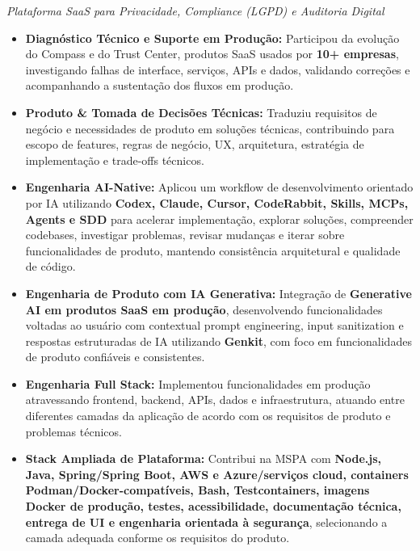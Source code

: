 \documentclass[10pt,a4paper]{article}
\begin{document}
\textit{Plataforma SaaS para Privacidade, Compliance (LGPD) e Auditoria Digital}

\begin{itemize}

    \item
    \textbf{Diagnóstico Técnico e Suporte em Produção:}
    Participou da evolução do Compass e do Trust Center, produtos
    SaaS usados por \textbf{10+ empresas}, investigando falhas de
    interface, serviços, APIs e dados, validando correções e
    acompanhando a sustentação dos fluxos em produção.

    \item
    \textbf{Produto \& Tomada de Decisões Técnicas:}
    Traduziu requisitos de negócio e necessidades de produto em
    soluções técnicas, contribuindo para escopo de features,
    regras de negócio, UX, arquitetura, estratégia de
    implementação e trade-offs técnicos.

    \item
    \textbf{Engenharia AI-Native:}
    Aplicou um workflow de desenvolvimento orientado por IA
    utilizando \textbf{Codex, Claude, Cursor, CodeRabbit, Skills,
    MCPs, Agents e SDD} para acelerar implementação, explorar
    soluções, compreender codebases, investigar problemas,
    revisar mudanças e iterar sobre funcionalidades de produto,
    mantendo consistência arquitetural e qualidade de código.

    \item
    \textbf{Engenharia de Produto com IA Generativa:}
    Integração de \textbf{Generative AI em produtos SaaS em
    produção}, desenvolvendo funcionalidades voltadas ao usuário
    com contextual prompt engineering, input sanitization e
    respostas estruturadas de IA utilizando \textbf{Genkit},
    com foco em funcionalidades de produto confiáveis e
    consistentes.

    \item
    \textbf{Engenharia Full Stack:}
    Implementou funcionalidades em produção atravessando
    frontend, backend, APIs, dados e infraestrutura, atuando
    entre diferentes camadas da aplicação de acordo com os
    requisitos de produto e problemas técnicos.

    \item
    \textbf{Stack Ampliada de Plataforma:}
    Contribui na MSPA com \textbf{Node.js, Java, Spring/Spring Boot,
    AWS e Azure/serviços cloud, containers Podman/Docker-compatíveis,
    Bash, Testcontainers, imagens Docker de produção, testes, acessibilidade,
    documentação técnica, entrega de UI e engenharia orientada à segurança},
    selecionando a camada adequada conforme os requisitos do produto.


\end{itemize}
\end{document}
